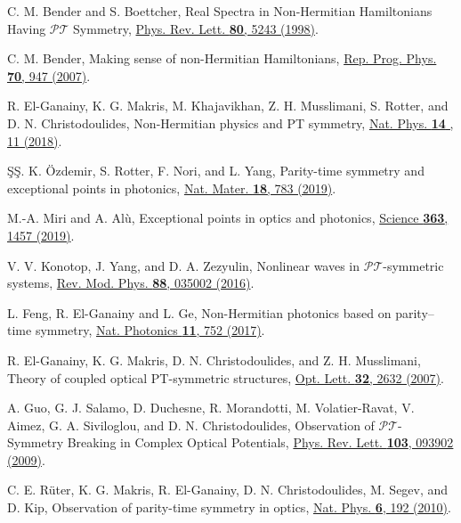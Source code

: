 \documentclass[twocolumn,prl,floatfix,citeautoscript,nofootinbib,superscriptaddress]{revtex4}
\begin{document}
\begin{thebibliography}{99}
 C. M. Bender and S. Boettcher, Real Spectra in
Non-Hermitian Hamiltonians Having $\mathcal{PT}$ Symmetry, \href{https://doi.org/10.1103/PhysRevLett.80.5243}%
{Phys. Rev. Lett. \textbf{80}, 5243 (1998)}.

 C. M. Bender, Making sense of non-Hermitian
Hamiltonians, \href{http://dx.doi.org/10.1088/0034-4885/70/6/R03}{Rep. Prog.
Phys. \textbf{70}, 947 (2007)}.

 R. El-Ganainy, K. G. Makris, M. Khajavikhan, Z. H.
Musslimani, S. Rotter, and D. N. Christodoulides, Non-Hermitian physics and
PT symmetry, \href{https://doi.org/10.1038/nphys4323}{Nat. Phys. \textbf{14}%
, 11 (2018)}.

 \ifmmode \mbox{\c{S}}\else \c{S}\fi{}. K.
\"Ozdemir, S. Rotter, F. Nori, and L. Yang, Parity-time symmetry and
exceptional points in photonics, \href{https://doi.org/10.1038/s41563-019-0304-9}%
{Nat. Mater. \textbf{18}, 783 (2019)}.

 M.-A. Miri and A. Al\`u, Exceptional points in
optics and photonics, \href{https://doi.org/10.1126/science.aar7709}{Science
\textbf{363}, 1457 (2019)}.

 V. V. Konotop, J. Yang, and D. A. Zezyulin,
Nonlinear waves in $\mathcal{PT}$-symmetric systems, \href{https://doi.org/10.1103/RevModPhys.88.035002}%
{Rev. Mod. Phys. \textbf{88}, 035002 (2016)}.

 L. Feng, R. El-Ganainy and L. Ge, Non-Hermitian photonics
based on parity--time symmetry, \href{https://doi.org/10.1038/s41566-017-0031-1}%
{Nat. Photonics \textbf{11}, 752 (2017)}.

 R. El-Ganainy, K. G. Makris, D. N. Christodoulides,
and Z. H. Musslimani, Theory of coupled optical PT-symmetric structures,
\href{https://doi.org/10.1364/OL.32.002632}{Opt. Lett. \textbf{32}, 2632
(2007)}.

 A. Guo, G. J. Salamo, D. Duchesne, R.
Morandotti, M. Volatier-Ravat, V. Aimez, G. A. Siviloglou, and D. N.
Christodoulides, Observation of $\mathcal{P}\mathcal{T}$-Symmetry Breaking
in Complex Optical Potentials, \href{https://doi.org/10.1103/PhysRevLett.103.093902}%
{Phys. Rev. Lett. \textbf{103}, 093902 (2009)}.

 C. E. R\"uter, K. G. Makris, R. El-Ganainy, D. N.
Christodoulides, M. Segev, and D. Kip, Observation of parity-time symmetry
in optics, \href{https://doi.org/10.1038/nphys1515}{Nat. Phys. \textbf{6},
192 (2010)}.


\end{thebibliography}
\end{document}
